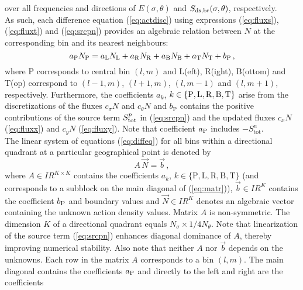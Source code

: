 \documentclass[12pt]{book}
\begin{document}
over all frequencies and directions of $E(\sigma,\theta)$ and $S_{\rm {ds,br}}(\sigma,\theta)$, respectively.
\\[2ex]
\noindent
As such, each difference equation (\ref{eq:actdisc}) using expressions (\ref{eq:fluxs}), (\ref{eq:fluxt})
and (\ref{eq:srcpn}) provides
an algebraic relation between $N$ at the corresponding bin and its nearest neighbours:
\begin{equation}
  a_{\rm P} N_{\rm P} = a_{\rm L} N_{\rm L}+
                                a_{\rm R} N_{\rm R}+
                                a_{\rm B} N_{\rm B}+
                                a_{\rm T} N_{\rm T}+
                                b_{\rm P} \, ,
  \label{eq:diffeq}
\end{equation}
where P corresponds to central bin $(l,m)$ and L(eft), R(ight), B(ottom)
and T(op) correspond to $(l-1,m)$, $(l+1,m)$, $(l,m-1)$ and $(l,m+1)$, respectively.
Furthermore, the coefficients
$a_k$, $k \in \{ \rm P,\rm L, \rm R, \rm B, \rm T \}$ arise from the
discretizations of the fluxes $c_{\sigma} N$ and $c_{\theta} N$ and $b_{\mathrm{P}}$ contains the positive contributions
of the source term $S_{\rm tot}^p$ in (\ref{eq:srcpn}) and the updated fluxes $c_x N$ (\ref{eq:fluxx}) and
$c_y N$ (\ref{eq:fluxy}). Note that coefficient $a_{\rm P}$ includes $-S_{\mathrm{tot}}^n$.
\\[2ex]
\noindent
The linear system of equations (\ref{eq:diffeq}) for all bins within a directional quadrant
at a particular geographical point is denoted by
\begin{equation}
  A \, \vec{N} = \vec{b} \, ,
  \label{eq:syseqs}
\end{equation}
where $A \in {\mbox{$I\!\!R$}}^{K \times K}$ contains the coefficients $a_k$, $k \in \{ \mathrm{P},
\mathrm{L}, \mathrm{R}, \mathrm{B}, \mathrm{T} \}$ (and
corresponds to a subblock on the main diagonal of (\ref{eq:matr})),
$\vec{b} \in {\mbox{$I\!\!R$}}^{K}$ contains the coefficient $b_{\rm P}$ and boundary values and
$\vec{N} \in {\mbox{$I\!\!R$}}^{K}$ denotes an algebraic vector containing the unknown
action density values. Matrix $A$ is non-symmetric. The dimension $K$ of a
directional quadrant equals $N_{\sigma} \times 1/4 N_{\theta}$.
Note that linearization of the source term (\ref{eq:srcpn}) enhances diagonal dominance of $A$, thereby improving numerical stability.
Also note that neither $A$ nor $\vec{b}$ depends on the unknowns.
Each row in the matrix $A$ corresponds to a bin
$(l,m)$. The main diagonal contains the coefficients
$a_{\rm P}$ and directly to the left and right are the coefficients
\end{document}
